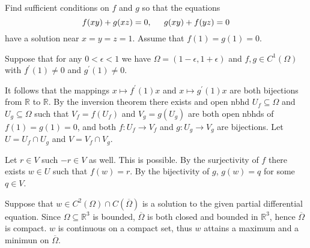 \documentclass[11pt]{article}
\begin{document}
\vspace{.5in}

\noindent {\bf [3]} Find sufficient conditions on $f$ and $g$ so that the equations
\[
f(xy)+g(xz)=0,\hspace{.2in}g(xy)+f(yz)=0 
\]
\noindent have a solution near $x=y=z=1$. Assume that $f(1)=g(1)=0$.

\vspace{.3in}

\noindent [proof]

Suppose that for any $0<\epsilon<1$ we have $\Omega=\left(1-\epsilon,1+\epsilon\right)$ and $f,g\in C^1(\Omega)$ with $f^{'}(1)\neq 0$ and $g^{'}(1)\neq 0$. 

\vspace{.2in}

It follows that the mappings $x\mapsto f^{'}(1)x$ and $x\mapsto g^{'}(1)x$ are both bijections from $\mathbb{R}$ to $\mathbb{R}$. By the inversion theorem there exists and open nbhd $U_f\subseteq \Omega$ and $U_g\subseteq \Omega$ such that $V_f=f(U_f)$ and $V_g=g(U_g)$
are both open nbhds of $f(1)=g(1)=0$, and both $f:U_f\rightarrow V_f$ and $g:U_g\rightarrow V_g$ are bijections. Let $U=U_f\cap U_g$ and $V=V_f\cap V_g$. 

\vspace{.2in}

Let $r\in V$ such $-r\in V$ as well. This is possible. By the surjectivity of $f$ there exists $w\in U$ such that $f(w)=r$. By the bijectivity of $g$, $g(w)=q$ for some $q\in V$. 

\vspace{.5in}

\noindent {\bf [4]} Suppose that $w\in C^2(\Omega)\cap C(\overline{\Omega})$ is a solution to the given partial differential equation. Since $\Omega\subseteq\mathbb{R}^3$ is bounded,  $\overline{\Omega}$ is both closed and bounded in $\mathbb{R}^3$, hence $\overline{\Omega}$ is compact. $w$ is continuous on a compact set, thus $w$ attains a maximum and a minimun on $\overline{\Omega}$.
\end{document}
